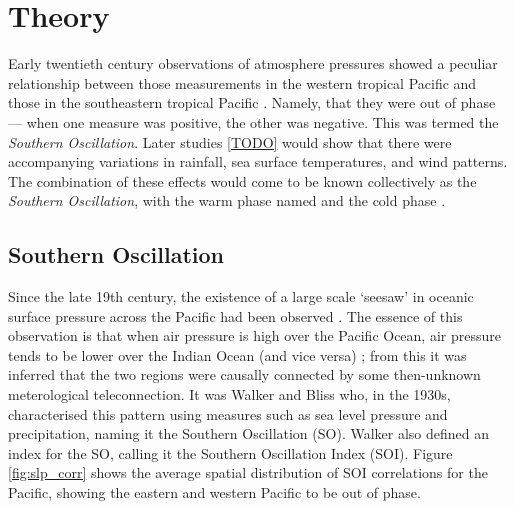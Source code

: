 \section{Theory}
\label{sec:theory}

Early twentieth century observations of atmosphere pressures showed a peculiar
relationship between those measurements in the western tropical Pacific and
those in the southeastern tropical Pacific \citep{holton1989}. Namely, that they
were out of phase --- when one measure was positive, the other was negative.
This was termed the \emph{Southern Oscillation}. Later studies \ref{TODO} would
show that there were accompanying variations in rainfall, sea surface
temperatures, and wind patterns. The combination of these effects would come to
be known collectively as the \elnino{} \emph{Southern Oscillation}, with the
warm phase named \elnino{} and the cold phase \nina{}.


\subsection{Southern Oscillation}
Since the late 19th century, the existence of a large scale `seesaw' in oceanic
surface pressure across the Pacific had been observed \citep{trenberth2000}. The
essence of this observation is that when air pressure is high over the Pacific
Ocean, air pressure tends to be lower over the Indian Ocean (and vice versa)
\citep{philander1990}; from this it was inferred that the two regions were
causally connected by some then-unknown meterological teleconnection. It was
Walker and Bliss who, in the 1930s, characterised this pattern using measures
such as sea level pressure and precipitation, naming it the Southern Oscillation
(SO). Walker also defined an index for the SO, calling it the Southern
Oscillation Index (SOI). Figure \ref{fig:slp_corr} shows the average spatial
distribution of SOI correlations for the Pacific, showing the eastern and
western Pacific to be out of phase.

